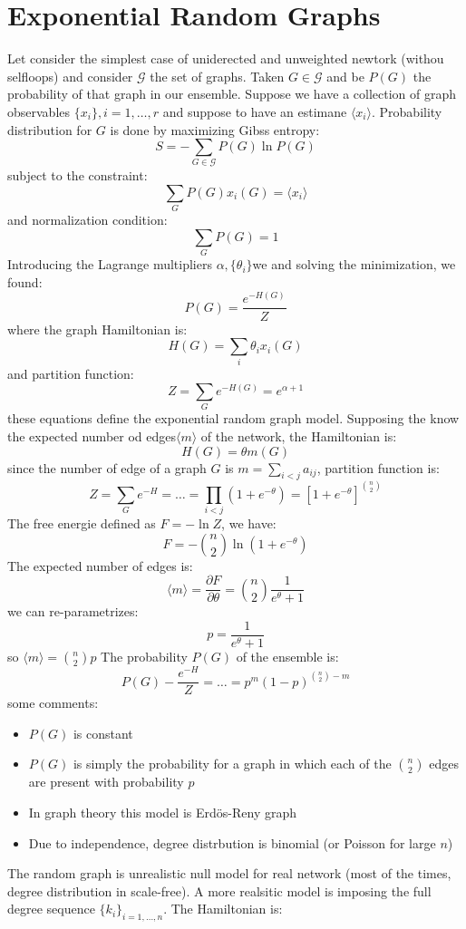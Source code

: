 \section{Exponential Random Graphs}
Let consider the simplest case of uniderected and unweighted newtork (withou selfloops) and consider $\mathcal{G}$ the set of graphs. Taken $G\in \mathcal{G}$ and be $P(G)$ the probability of that graph in our ensemble. Suppose we have a collection of graph observables $\{x_i\}, i =1,\ldots,r$ and suppose to have an estimane $\langle x_i \rangle$. Probability distribution for $G$ is done by maximizing Gibss entropy:
\[
S = - \sum_{G \in \mathcal{G}} P(G) \ln P(G)
 \]
subject to the constraint:
\[
\sum_G P(G) x_i(G) = \langle x_i \rangle
\]
and normalization condition:
\[
\sum_G P(G) =1
\]
Introducing the Lagrange multipliers $\alpha, \{\theta_i\}$we and solving the minimization, we found:
\[
P(G) = \frac{e^{-H(G)}}{Z}
\]
where the graph Hamiltonian is:
\[
H(G) = \sum_i \theta_ix_i(G)
\]
and partition function:
\[
Z =\sum_G e^{-H(G)} = e^{\alpha + 1}
\]
these equations define the exponential random graph model. Supposing the know the expected number od edges$\langle m \rangle$ of the network, the Hamiltonian is:
\[
H(G) = \theta m(G)
\]
since the number of edge of a graph $G$ is $m = \sum_{i<j} a_{ij}$, partition function is:
\[
Z = \sum_Ge^{-H} =\ldots = \prod_{i<j} \left(1 + e^{-\theta}\right) = [1 + e^{-\theta}]^{n \choose 2}
\]
The free energie defined as $F = - \ln Z$, we have:
\[
F = - {n \choose 2} \ln (1+ e^{-\theta})
\]
The expected number of edges is:
\[
\langle m\rangle = \frac{\partial F}{\partial \theta} = {n \choose 2}\frac{1}{e^\theta +1}
\]
we can re-parametrizes:
\[
p =\frac{1}{e^{\theta} + 1}
\]
so $\langle m \rangle = {n \choose 2}p$
The probability $P(G)$ of the ensemble is:
\[
P(G) -\frac{e^{-H}}{Z} = \ldots = p^m(1-p)^{{n \choose 2} -m}
\]
some comments:
\begin{itemize}
	\item $P(G)$ is constant
	\item $P(G)$ is simply the probability for a graph in which each of the ${n \choose 2}$ edges are present with probability $p$
	\item In graph theory this model is Erd\"os-Reny graph
	\item Due to independence, degree distrbution is binomial (or Poisson for large $n$)
\end{itemize}
The random graph is unrealistic null model for real network (most of the times, degree distribution in scale-free). A more realsitic model is imposing the full degree sequence $\{k_i\}_{i =1,\ldots,n}$. The Hamiltonian is:
